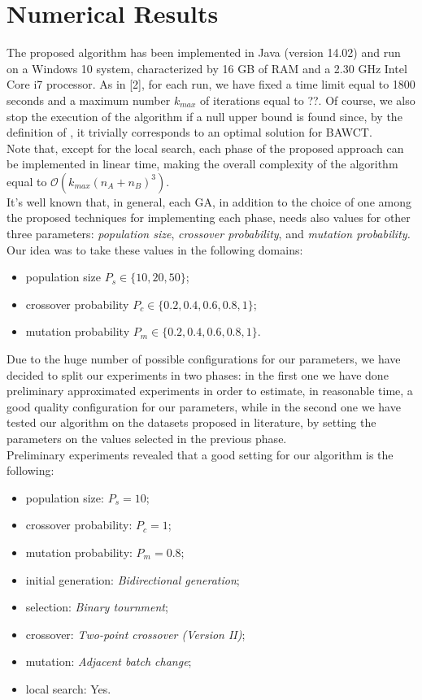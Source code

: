 \documentclass[opre,nonblindrev]{informs3} %
\begin{document}
\section{Numerical Results}
The proposed algorithm has been implemented in Java (version 14.02) and run on a Windows 10 system, characterized by 16 GB of RAM and a 2.30 GHz Intel Core i7 processor. As in [2], for each run, we have fixed a time limit equal to 1800 seconds and a maximum number $k_{max}$ of iterations equal to ??. Of course, we also stop the execution of the algorithm if a null upper bound is found since, by the definition of , it trivially corresponds to an optimal solution for BAWCT.\\ 
 Note that, except for the local search, each phase of the proposed approach can be implemented in linear time, making the overall complexity of the algorithm equal to $\mathcal{O}(k_{max}(n_A+n_B)^3)$.\\
It's well known that, in general, each GA, in addition to the choice of one among the proposed techniques for implementing each phase, needs also values for other three parameters: \textit{population size}, \textit{crossover probability}, and \textit{mutation probability.}\\
Our idea was to take these values in the following domains:
\begin{itemize}
	\item population size $P_s \in \{10,20,50\}$;
	\item crossover probability $P_c \in \{0.2,0.4,0.6,0.8,1\}$;
	\item mutation probability $P_m \in \{0.2,0.4,0.6,0.8,1\}$.
\end{itemize}
Due to the huge number of possible configurations for our parameters, we have decided to split our experiments in two phases: in the first one we have done preliminary approximated experiments in order to estimate, in reasonable time, a good quality configuration for our parameters, while in the second one we have tested our algorithm on the datasets proposed in literature, by setting the parameters on the values selected in the previous phase.\\
Preliminary experiments revealed that a good setting for our algorithm is the following:
\begin{itemize}
\item population size: $P_s = 10$;
\item crossover probability: $P_c = 1$;
\item mutation probability: $P_m = 0.8$;
\item initial generation: \textit{Bidirectional generation};
\item selection: \textit{Binary tournment};
\item crossover: \textit{Two-point crossover (Version II)};
\item  mutation: \textit{Adjacent batch change};
\item local search: Yes.
\end{itemize}
\end{document}
